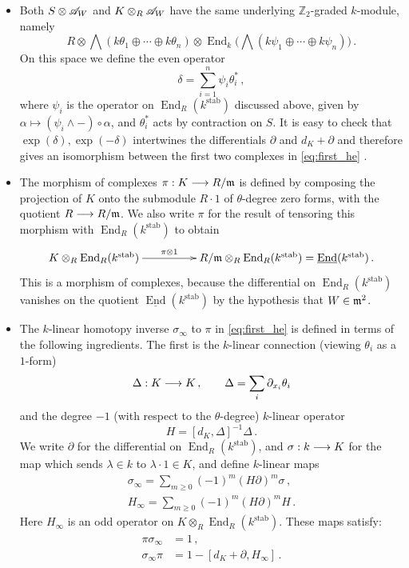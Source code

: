 \documentclass[english,letter paper,12pt,leqno]{article}
\theoremstyle{example}
\numberwithin{equation}{section}
\def\stab{\operatorname{stab}}
\def\be{\begin{equation}}
\def\ee{\end{equation}}
\def\nZ{\mathds{Z}}
\DeclareMathOperator{\End}{End}
\begin{document}
\begin{itemize}
\item Both $S \otimes \mathscr{A}_W$ and $K \otimes_R \mathscr{A}_W$ have the same underlying $\nZ_2$-graded $k$-module, namely
\be\label{eq:same_underlying}
R \otimes \bigwedge( k\theta_1 \oplus \cdots \oplus k \theta_n ) \otimes \End_k\big( \bigwedge( k\psi_1 \oplus \cdots \oplus k \psi_n ) \big)\,.
\ee
On this space we define the even operator
\be
\delta = \sum_{i=1}^n \psi_i \theta_i^*\,,
\ee
where $\psi_i$ is the operator on $\End_R(k^{\stab})$ discussed above, given by $\alpha \mapsto (\psi_i \wedge -) \circ \alpha$, and $\theta_i^*$ acts by contraction on $S$. It is easy to check that $\exp(\delta),\exp(-\delta)$ intertwines the differentials $\partial$ and $d_K + \partial$ and therefore gives an isomorphism between the first two complexes in \eqref{eq:first_he} \cite[Proposition 4.11]{murfet}.
\item The morphism of complexes $\pi: K \longrightarrow R/\mathfrak{m}$ is defined by composing the projection of $K$ onto the submodule $R \cdot 1$ of $\theta$-degree zero forms, with the quotient $R \longrightarrow R/\mathfrak{m}$. We also write $\pi$ for the result of tensoring this morphism with $\End_R(k^{\stab})$ to obtain
\[
\xymatrix@C+2pc{
K \otimes_R \End_R(k^{\stab}) \ar[r]^-{\pi \otimes 1} & R/\mf{m} \otimes_R \End_R(k^{\stab}) = \underline{\End}(k^{\stab})\,.
}
\]
This is a morphism of complexes, because the differential on $\End_R(k^{\stab})$ vanishes on the quotient $\underline{\End}(k^{\stab})$ by the hypothesis that $W \in \mathfrak{m}^2$.
\item The $k$-linear homotopy inverse $\sigma_\infty$ to $\pi$ in \eqref{eq:first_he} is defined in terms of the following ingredients. The first is the $k$-linear connection (viewing $\theta_i$ as a $1$-form)
\be
\Delta: K \lto K\,, \qquad \Delta = \sum_i \partial_{x_i} \theta_i
\ee
and the degree $-1$ (with respect to the $\theta$-degree) $k$-linear operator
\be
H = [d_K, \Delta]^{-1} \Delta\,.
\ee
We write $\partial$ for the differential on $\End_R(k^{\stab})$, and $\sigma: k \longrightarrow K$ for the map which sends $\lambda \in k$ to $\lambda \cdot 1 \in K$, and define $k$-linear maps
\begin{align}
\sigma_\infty = \sum_{m \ge 0} (-1)^m (H \partial)^m \sigma\,,\\
H_\infty = \sum_{m \ge 0} (-1)^m (H \partial)^m H\,.
\end{align}
Here $H_\infty$ is an odd operator on $K \otimes_R \End_R(k^{\stab})$. These maps satisfy:
\begin{align}
\pi \sigma_\infty &= 1\,,\\
 \sigma_\infty \pi &= 1 - [d_K + \partial, H_\infty]\,.
\end{align}
\end{itemize}
\end{document}
